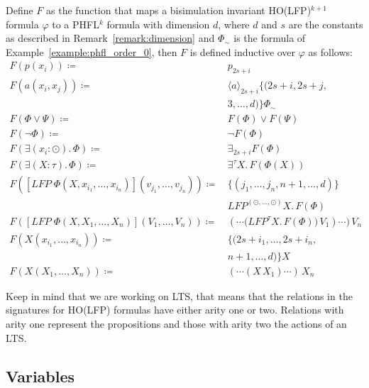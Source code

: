 \begin{definition}
    \label{definition:lower_bounds_phfl_formula_function}
   Define $F$ as the function that maps a bisimulation invariant HO(LFP)$^{k+1}$ formula $\varphi$ to a PHFL$^k$ formula with dimension $d$, where $d$ and $s$ are the constants as described in Remark~\ref{remark:dimension} and $\Phi_\sim$ is the formula of Example~\ref{example:phfl_order_0}, then $F$ is defined
    inductive over $\varphi$ as follows:
    \begin{align*}
        F(p(x_i)) \coloneqq &\, p_{2s+i} \\
        F(a(x_i, x_j)) \coloneqq &\, \langle a \rangle_{2s+i} \{(2s+i, 2s+j, \\
        &\,3, \dots, d)\} \Phi_\sim \\
        F(\Phi \vee \Psi) \coloneqq &\, F(\Phi) \vee F(\Psi) \\
        F(\neg \Phi) \coloneqq &\, \neg F(\Phi) \\
        F(\exists (x_i \colon \odot).\,\Phi) \coloneqq &\, \exists_{2s+i} F(\Phi) \\
        F(\exists (X \colon \tau).\,\Phi) \coloneqq &\, \exists^\tau X.\,F(\Phi(X)) \\
        F([LFP\;\Phi(X, x_{i_1}, \dots, x_{i_n})](v_{j_1}, \dots, v_{j_n})) \coloneqq &\,\{(j_1, \dots, j_n, n + 1, \dots, d)\} \\
        &\,LFP^{(\odot, \dots, \odot)} X.\, F(\Phi) \\
        F([LFP\;\Phi(X, X_1, \dots, X_n)](V_1, \dots, V_n)) \coloneqq &\,(\dotsb \big(LFP^\tau X.\, F(\Phi)\big)\,V_1)\dotsb)\,V_n \\
        F(X(x_{i_1}, \dots, x_{i_n})) \coloneqq &\, \{(2s+i_1, \dots, 2s+i_n, \\
        &\,n + 1, \dots, d)\}X\\
        F(X(X_1, \dots, X_n)) \coloneqq &\, (\dotsb (X\,X_1)\dotsb)\,X_n
    \end{align*}
\end{definition}
Keep in mind that we are working on LTS, that means that the relations in the signatures for HO(LFP) formulas have either arity one or two. Relations with arity one represent the 
propositions and those with arity two the actions of an LTS.

\subsection{Variables}\label{subsec:lower_bounds_variables}

